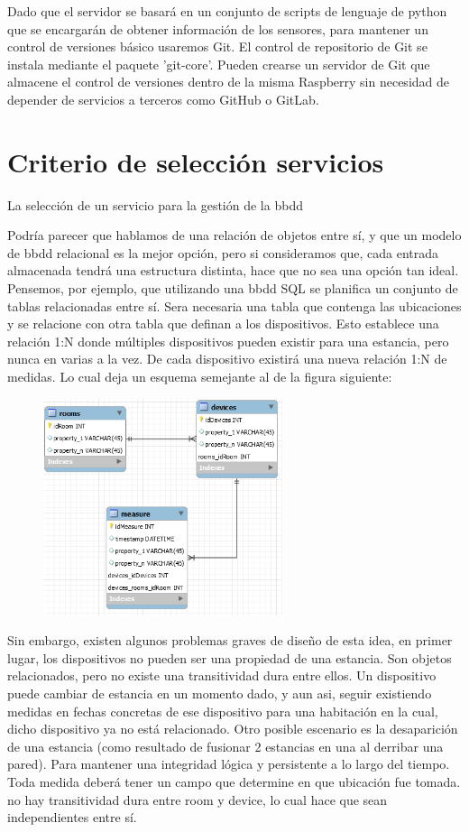Dado que el servidor se basará en un conjunto de scripts de lenguaje de python que se encargarán de obtener información de los sensores, para mantener un control de versiones básico usaremos Git. El control de repositorio de Git se instala mediante el paquete 'git-core'. Pueden crearse un servidor de Git que almacene el control de versiones dentro de la misma Raspberry sin necesidad de depender de servicios a terceros como GitHub o GitLab.


\section{Criterio de selección servicios}
\label{makereference4.4}
La selección de un servicio para la gestión de la \gls{bbdd}


Podría parecer que hablamos de una relación de objetos entre sí, y que un modelo de \gls{bbdd} relacional es la mejor opción, pero si consideramos que, cada entrada almacenada tendrá una estructura distinta, hace que no sea una opción tan ideal. Pensemos, por ejemplo, que utilizando una \gls{bbdd} SQL se planifica un conjunto de tablas relacionadas entre sí. Sera necesaria una tabla que contenga las ubicaciones y se relacione con otra tabla que definan a los dispositivos. Esto establece una relación 1:N donde múltiples dispositivos pueden existir para una estancia, pero nunca en varias a la vez. De cada dispositivo existirá una nueva relación 1:N de medidas. Lo cual deja un esquema semejante al de la figura siguiente:


\begin{figure}[hbt!]
\centering
\includegraphics[height=2.5in]{figures/SQLSchemaExample_1.png}
\end{figure}

\vspace{1.5cm}

Sin embargo, existen algunos problemas graves de diseño de esta idea, en primer lugar, los dispositivos no pueden ser una propiedad de una estancia. Son objetos relacionados, pero no existe una transitividad dura entre ellos. Un dispositivo puede cambiar de estancia en un momento dado, y aun asi, seguir existiendo medidas en fechas concretas de ese dispositivo para una habitación en la cual, dicho dispositivo ya no está relacionado. Otro posible escenario es la desaparición de una estancia (como resultado de fusionar 2 estancias en una al derribar una pared). Para mantener una integridad lógica y persistente a lo largo del tiempo. Toda medida deberá tener un campo que determine en que ubicación fue tomada.
no hay transitividad dura entre room y device, lo cual hace que sean independientes entre sí.


